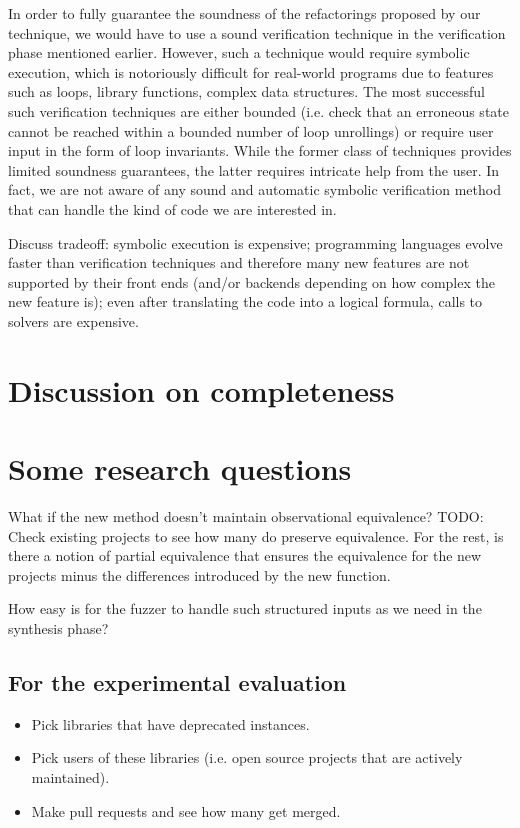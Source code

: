 \documentclass[runningheads,a4paper]{llncs}
\begin{document}
In order to fully guarantee the soundness of the refactorings proposed
by our technique, we would have to use a sound verification technique
in the verification phase mentioned earlier. However, such a technique
would require symbolic execution, which is notoriously difficult for
real-world programs due to features such as loops, library functions,
complex data structures. The most successful such verification
techniques are either bounded (i.e. check that an erroneous state
cannot be reached within a bounded number of loop unrollings) or
require user input in the form of loop invariants. While the former
class of techniques provides limited soundness guarantees, the latter
requires intricate help from the user.  In fact, we are not aware of
any sound and automatic symbolic verification method that can handle
the kind of code we are interested in.

Discuss tradeoff: symbolic execution is expensive; programming
languages evolve faster than verification techniques and therefore
many new features are not supported by their front ends (and/or
backends depending on how complex the new feature is); even after
translating the code into a logical formula, calls to solvers are
expensive.

\section{Discussion on completeness}



\section{Some research questions}

What if the new method doesn't maintain observational equivalence?
TODO: Check existing projects to see how many do preserve equivalence.
For the rest, is there a notion of partial equivalence that ensures the equivalence
for the new projects minus the differences introduced by the new function.

How easy is for the fuzzer to handle such structured inputs as we need in the
synthesis phase?


\subsection{For the experimental evaluation}
\begin{itemize}
\item Pick libraries that have deprecated instances.
\item Pick users of these libraries (i.e. open source projects that are actively maintained).
\item Make pull requests and see how many get merged.
\end{itemize}  
\end{document}
